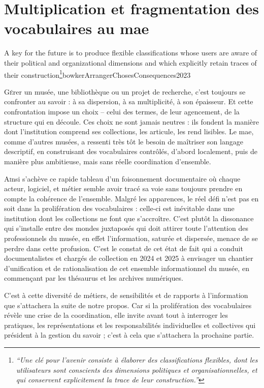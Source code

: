 \chapter[Les vocabulaires contrôlés au \ac{mae}]{\label{II-A} Multiplication et fragmentation des vocabulaires au \ac{mae}}


\begin{myquote}
	{A key for the future is to produce flexible classifications whose users are aware of their political and organizational dimensions and which explicitly retain traces of their construction\footnote{\textit{\enquote{Une clé pour l’avenir consiste à élaborer des classifications flexibles, dont les utilisateurs sont conscients des dimensions politiques et organisationnelles, et qui conservent explicitement la trace de leur construction.}}}}{bowkerArrangerChosesConsequences2023}
\end{myquote}

\lettrine{G}érer un musée, une bibliothèque ou un projet de recherche, c’est toujours se confronter au savoir : à sa dispersion, à sa multiplicité, à son épaisseur. Et cette confrontation impose un choix – celui des termes, de leur agencement, de la structure qui en découle. Ces choix ne sont jamais neutres : ils fondent la manière dont l’institution comprend ses collections, les articule, les rend lisibles. Le \ac{mae}, comme d’autres musées, a ressenti très tôt le besoin de maîtriser son langage descriptif, en construisant des vocabulaires contrôlés, d’abord localement, puis de manière plus ambitieuse, mais sans réelle coordination d’ensemble.






\bigskip
\bigskip
\bigskip

\lettrine{A}insi s’achève ce rapide tableau d’un foisonnement documentaire où chaque acteur, logiciel, et métier semble avoir tracé sa voie sans toujours prendre en compte la cohérence de l'ensemble. Malgré les apparences, le réel défi n'est pas en soit dans la prolifération des vocabulaires : celle-ci est inévitable dans une institution dont les collections ne font que s'accroître.  C'est plutôt la dissonance qui s’installe entre des mondes juxtaposés qui doit attirer toute l'attention des professionnels du musée, en effet  l’information, saturée et dispersée, menace de se perdre dans cette profusion. C'est le constat de cet état de fait qui a conduit documentalistes et chargés de collection en 2024 et 2025 à envisager un chantier d'unification et de rationalisation de cet ensemble informationnel du musée, en commençant par les thésaurus et les archives numériques.


C’est à cette diversité de métiers, de sensibilités et de rapports à l’information que s’attachera la suite de notre propos. Car si la prolifération des vocabulaires révèle une crise de la coordination, elle invite avant tout à interroger les pratiques, les représentations et les responsabilités individuelles et collectives qui président à la gestion du savoir ; c'est à cela que s'attachera la prochaine partie.